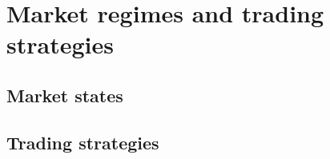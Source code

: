 \section{Market regimes and trading strategies}

\subsection{Market states}

\subsection{Trading strategies}